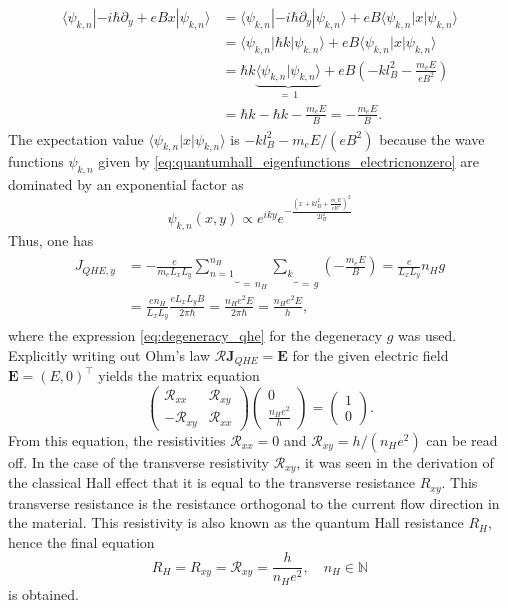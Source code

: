 \documentclass{report}
\numberwithin{tm}{section}
\newcommand\matr[1]{\ensuremath{\boldsymbol{\mathbf{#1}}}}
\newcommand\vect[1]{\ensuremath{\bm{#1}}}
\begin{document}
\begin{align}
	\begin{aligned}
		\langle \psi_{k,n}|-i\hbar \partial_y + eBx|\psi_{k,n}\rangle &= \langle \psi_{k,n}|-i\hbar\partial_y|\psi_{k,n}\rangle + eB\langle \psi_{k,n}|x|\psi_{k,n}\rangle \\
		&= \langle \psi_{k,n}|\hbar k|\psi_{k,n}\rangle + eB\langle \psi_{k,n}|x|\psi_{k,n}\rangle \\
		&= \hbar k \underbrace{\langle \psi_{k,n}|\psi_{k,n}\rangle}_{=\,1} + eB\left(-kl_B^2-\frac{m_e E}{eB^2}\right) \\
		&= \hbar k - \hbar k -\frac{m_e E}{B} = -\frac{m_e E}{B}.
	\end{aligned}
\end{align} The expectation value $\langle \psi_{k,n}|x|\psi_{k,n}\rangle$ is $-kl_B^2 - m_eE/(eB^2)$ because the wave functions $\psi_{k,n}$ given by \cref{eq:quantumhall_eigenfunctions_electricnonzero} are dominated by an exponential factor as \begin{equation}
\psi_{k,n}(x,y) \propto e^{iky}e^{-\frac{\left(x+kl_B^2+\frac{m_e E}{eB^2}\right)^2}{2l_B^2}}
\end{equation} Thus, one has \begin{align}
\begin{aligned}
	J_{QHE,y} &= -\frac{e}{m_eL_xL_y}\underbrace{\sum_{n=1}^{n_H}}_{=\,n_H}\underbrace{\sum_{k}}_{=\,g}\left(-\frac{m_eE}{B}\right) = \frac{e}{L_xL_y}n_H g \\
	&= \frac{en_H}{L_xL_y}\frac{eL_xL_y B}{2\pi\hbar} = \frac{n_He^2 E}{2\pi\hbar} = \frac{n_H e^2 E}{h},
\end{aligned}
\end{align} where the expression \cref{eq:degeneracy_qhe} for the degeneracy $g$ was used. Explicitly writing out Ohm's law $\matr{\mathcal{R}}\vect{J}_{QHE} = \vect{E}$ for the given electric field $\vect{E} = (E,0)^\top$ yields the matrix equation \begin{equation}
\begin{pmatrix}
	\mathcal{R}_{xx} & \mathcal{R}_{xy} \\ -\mathcal{R}_{xy} &  \mathcal{R}_{xx}
\end{pmatrix}\begin{pmatrix}
0 \\ \frac{n_H e^2}{h}
\end{pmatrix} = \begin{pmatrix}
1 \\ 0
\end{pmatrix}.
\end{equation} From this equation, the resistivities $\mathcal{R}_{xx} = 0$ and $\mathcal{R}_{xy} = h/(n_He^2)$ can be read off. In the case of the transverse resistivity $\mathcal{R}_{xy}$, it was seen in the derivation of the classical Hall effect that it is equal to the transverse resistance $R_{xy}$. This transverse resistance is the resistance orthogonal to the current flow direction in the material. This resistivity is also known as the quantum Hall resistance $R_H$, hence the final equation \begin{equation}
R_H = R_{xy} = \mathcal{R}_{xy} = \frac{h}{n_He^2},  \quad n_H \in \mathbb{N}
\end{equation} is obtained.
\end{document}
